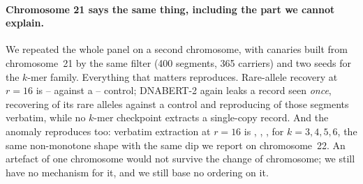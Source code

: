 \paragraph{Chromosome 21 says the same thing, including the part we cannot explain.}
We repeated the whole panel on a second chromosome, with canaries built from chromosome~21 by the
same filter (400 segments, 365 carriers) and two seeds for the $k$-mer family. Everything that
matters reproduces. Rare-allele recovery at $r{=}16$ is -- against a
-- control; DNABERT-2 again leaks a record seen \emph{once}, recovering
 of its rare alleles against a  control and reproducing  of those
segments verbatim, while no $k$-mer checkpoint extracts a single-copy record. And the anomaly
reproduces too: verbatim extraction at $r{=}16$ is , , ,  for
$k=3,4,5,6$, the same non-monotone shape with the same  dip we report on chromosome~22. An
artefact of one chromosome would not survive the change of chromosome; we still have no mechanism
for it, and we still base no ordering on it.
